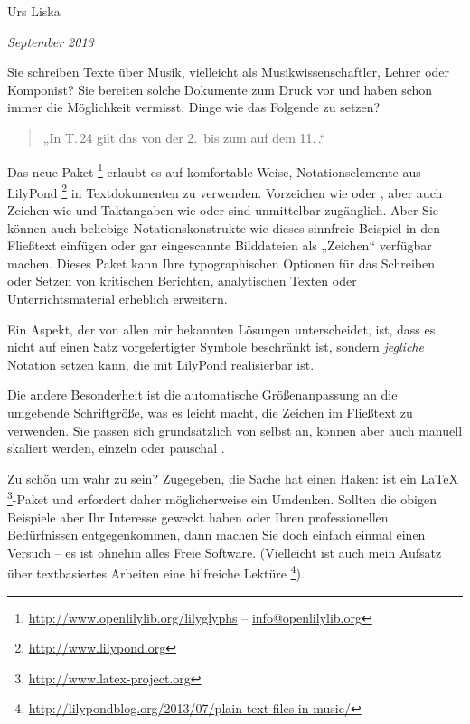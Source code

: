 \documentclass[oneside,11pt]{article}
\begin{document}
\begin{center}
{ \Huge \lilyglyphs }

\bigskip
{ \Large Urs Liska }

\emph{September 2013} 

\end{center}

\bigskip

Sie schreiben Texte über Musik, vielleicht als Musikwissenschaftler, Lehrer oder Komponist?
Sie bereiten solche Dokumente zum Druck vor und haben schon immer die Möglichkeit vermisst, Dinge wie das Folgende zu setzen?

\begin{quote}
„In T.\,24 gilt das \decrescHairpin{} von der 2.\,\halfNote{} bis zum  auf dem 11.\,\semiquaverDown[raise=-.5].“
\end{quote}

Das neue Paket \lilyglyphs{}%
\footnote{\url{http://www.openlilylib.org/lilyglyphs} -- \href{mailto:info@openlilylib.org}{info@openlilylib.org}}
erlaubt es auf komfortable Weise, Notationselemente aus LilyPond%
\footnote{\url{http://www.lilypond.org}}
in Textdokumenten zu verwenden.
Vorzeichen wie \flat{} oder \sharp, aber auch Zeichen wie \hspace{.5ex}\fermata{} und Taktangaben wie \lilyTimeCHalf{} oder  sind unmittelbar zugänglich.
Aber Sie können auch beliebige Notationskonstrukte wie \lilyFancyExample{} dieses sinnfreie Beispiel in den Fließtext einfügen oder gar eingescannte Bilddateien als „Zeichen“ verfügbar machen.
Dieses Paket kann Ihre typographischen Optionen für das Schreiben oder Setzen von kritischen Berichten, analytischen Texten oder Unterrichtsmaterial erheblich erweitern.

Ein Aspekt, der \lilyglyphs{} von allen mir bekannten Lösungen unterscheidet, ist, dass es nicht auf einen Satz vorgefertigter Symbole beschränkt ist, sondern \emph{jegliche} Notation setzen kann, die mit LilyPond realisierbar ist.

\footnotesize
Die andere Besonderheit ist die \halfNoteRest{} automatische Größenanpassung an die umgebende Schriftgröße,
\large was es leicht macht, die \halfNoteRest{} Zeichen im Fließtext zu verwenden.
\normalsize 
Sie passen sich grundsätzlich von selbst an, können aber auch \clefF[scale=.4] manuell skaliert werden, einzeln oder pauschal \clefG[scale=1.3,raise=-2.9].

\medskip
Zu schön um wahr zu sein? 
Zugegeben, die Sache hat einen Haken: \lilyglyphs{} ist ein \LaTeX{}%
\footnote{\url{http://www.latex-project.org}}-Paket und erfordert daher möglicherweise ein Umdenken.
Sollten die obigen Beispiele aber Ihr Interesse geweckt haben oder Ihren professionellen Bedürfnissen entgegenkommen, dann machen Sie doch einfach einmal einen Versuch -- es ist ohnehin alles Freie Software.
(Vielleicht ist auch mein Aufsatz über textbasiertes Arbeiten eine hilfreiche Lektüre%
\footnote{\url{http://lilypondblog.org/2013/07/plain-text-files-in-music/}}).
 
\end{document}

